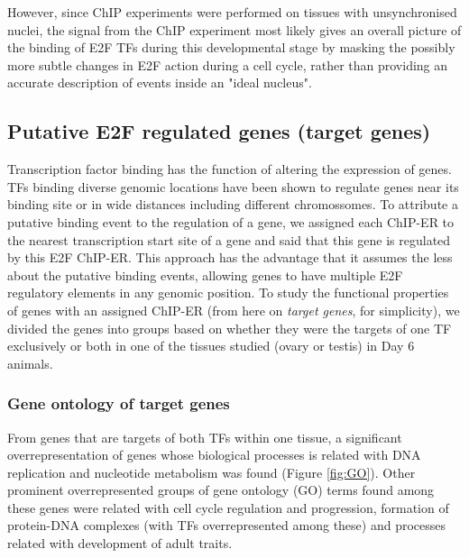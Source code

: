 \documentclass[11pt,twoside,a4paper]{report}
\begin{document}
		However, since ChIP experiments were performed on tissues with unsynchronised nuclei, the signal from the ChIP experiment most likely gives an overall picture of the binding of E2F TFs during this developmental stage by masking the possibly more subtle changes in E2F action during a cell cycle, rather than providing an accurate description of events inside an "ideal nucleus".
		
	\subsection{Putative E2F regulated genes (target genes)}
		Transcription factor binding has the function of altering the expression of genes. TFs binding diverse genomic locations have been shown to regulate genes near its binding site or in wide distances including different chromossomes. To attribute a putative binding event to the regulation of a gene, we assigned each ChIP-ER to the nearest transcription start site of a gene and said that this gene is regulated by this E2F ChIP-ER. This approach has the advantage that it assumes the less about the putative binding events, allowing genes to have multiple E2F regulatory elements in any genomic position. To study the functional properties of genes with an assigned ChIP-ER (from here on \textit{target genes}, for simplicity), we divided the genes into groups based on whether they were the targets of one TF exclusively or both in one of the tissues studied (ovary or testis) in Day 6 animals.
		
		\subsubsection{Gene ontology of target genes}
		From genes that are targets of both TFs within one tissue, a significant overrepresentation of genes whose biological processes is related with DNA replication and nucleotide metabolism was found (Figure \ref{fig:GO}). Other prominent overrepresented groups of gene ontology (GO) terms found among these genes were related with cell cycle regulation and progression, formation of protein-DNA complexes (with TFs overrepresented among these) and processes related with development of adult traits.
		
\end{document}
